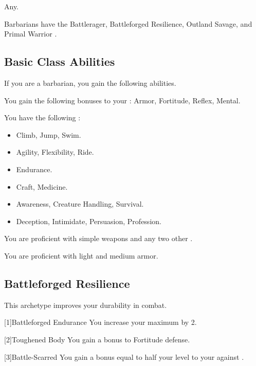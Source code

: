      Any.

     Barbarians have the Battlerager, Battleforged Resilience, Outland Savage, and Primal Warrior .

    \subsection{Basic Class Abilities}
        If you are a barbarian, you gain the following abilities.

        You gain the following bonuses to your :  Armor,  Fortitude,  Reflex,  Mental.

        You have the following :
        \begin{itemize}
            \item {} Climb, Jump, Swim.
            \item {} Agility, Flexibility, Ride.
            \item {} Endurance.
            \item {} Craft, Medicine.
            \item {} Awareness, Creature Handling, Survival.
            \item {} Deception, Intimidate, Persuasion, Profession.
        \end{itemize}

        You are proficient with simple weapons and any two other .

        You are proficient with light and medium armor.

    \subsection{Battleforged Resilience}
        This archetype improves your durability in combat.

        [1]{Battleforged Endurance} You increase your maximum  by 2.

        [2]{Toughened Body} You gain a  bonus to Fortitude defense.

        [3]{Battle-Scarred} You gain a bonus equal to half your level to your  against .

